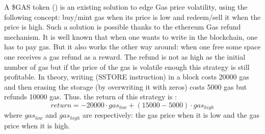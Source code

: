 A \$GAS token (\cite{noauthor_gastokenio_nodate}) is an existing solution to edge Gas price volatility, using the following concept: buy/mint gas when its price is low and redeem/sell it when the price is high. Such a solution is possible thanks to the ethereum Gas refund mechanism. It is well known that when one wants to write in the blockchain, one has to pay gas. But it also works the other way around: when one free some space one receives a gas refund as a reward. The refund is not as high as the initial number of gas but if the price of the gas is volatile enough this strategy is still profitable. In theory, writing (SSTORE instruction)  in a block costs 20000 gas and then erasing the storage (by overwriting it with zeros) costs 5000 gas but refunds 10000 gas. Thus. the return of this strategy is :
$$return=-20000\cdot gas_{low}+(15000-5000)\cdot gas_{high}$$
where 
$gas_{low}$ and $gas_{high}$ are respectively: the gas price when it is low and the gas price when it is high. 

